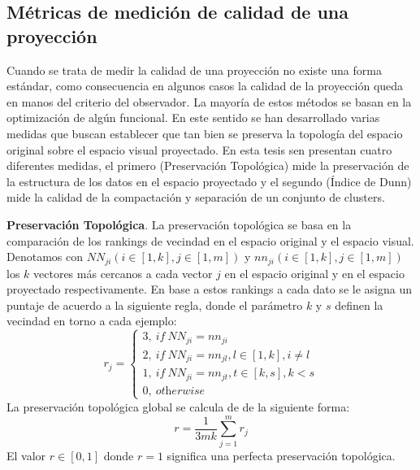 \subsection{Métricas de medición de calidad de una proyección}
Cuando se trata de medir la calidad de una proyección no existe una forma estándar, como consecuencia en algunos casos la calidad de la proyección queda en manos del criterio del observador. La mayoría de estos métodos se basan en la optimización de algún funcional. En este sentido se han desarrollado varias medidas que buscan establecer que tan bien se preserva la topología del espacio original sobre el espacio visual proyectado. En esta tesis sen presentan cuatro diferentes medidas, el primero (Preservación Topológica) mide la preservación de la estructura de los datos en el espacio proyectado y el segundo (Índice de Dunn) mide la calidad de la compactación y separación de un conjunto de clusters.

\textbf{Preservación Topológica}. La preservación topológica \cite{konig2000interactive} se basa en la comparación de los rankings de vecindad en el espacio original y el espacio visual. Denotamos con $NN_{ji}(i\in[1,k], j\in[1,m])$ y
$nn_{ji}(i\in[1,k], j\in[1,m])$ los $k$ vectores más cercanos a cada vector $j$ en el espacio original y en el espacio proyectado respectivamente. En base a estos rankings a cada dato se le asigna un puntaje de acuerdo a la siguiente regla, donde el parámetro $k$ y $s$ definen la vecindad en torno a cada ejemplo:
 \begin{equation}
	r_{j}=\left\{
                \begin{array}{ll}
									3,~if~NN_{ji} = nn_{ji}\\
									2,~if~NN_{ji} = nn_{jl}, l\in[1,k],i\neq l\\
									1,~if~NN_{ji} = nn_{jt}, t\in[k,s],k<s\\
									0,~\textit{otherwise}
                \end{array}\right.
		\end{equation}
La preservación topológica global se calcula de de la siguiente forma:
\begin{equation}
r=\frac{1}{3mk}\sum^{m}_{j=1}r_j
\end{equation}  		
El valor $r \in [0,1]$ donde  $r=1$ significa una perfecta preservación topológica.

